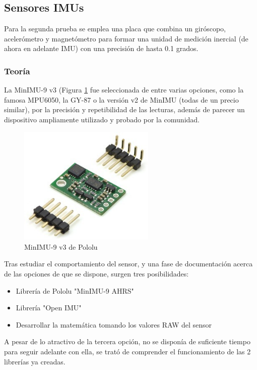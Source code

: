 
\subsection{Sensores IMUs}
Para la segunda prueba se emplea una placa que combina un giróscopo, acelerómetro y magnetómetro para formar una unidad de medición inercial (de ahora en adelante IMU) con una precisión de hasta 0.1 grados.

\subsubsection{Teoría}

La MinIMU-9 v3 (Figura \ref{fig:MinIMU_board} fue seleccionada de entre varias opciones, como la famosa MPU6050, la GY-87 o la versión v2 de MinIMU (todas de un precio similar), por la precisión y repetibilidad de las lecturas, además de parecer un dispositivo ampliamente utilizado y probado por la comunidad.

\begin{figure}
\centering
\includegraphics[width=65mm]{Figures/MinIMU_board}
\caption[MinIMU-9 v3 de Pololu]{MinIMU-9 v3 de Pololu}
\label{fig:MinIMU_board}
\end{figure}

Tras estudiar el comportamiento del sensor, y una fase de documentación acerca de las opciones de que se dispone, surgen tres posibilidades:

\begin{itemize}
  \item Librería de Pololu "MinIMU-9 AHRS"
  \item Librería "Open IMU"
  \item Desarrollar la matemática tomando los valores RAW del sensor
\end{itemize}

A pesar de lo atractivo de la tercera opción, no se disponía de suficiente tiempo para seguir adelante con ella, se trató de comprender el funcionamiento de las 2 librerías ya creadas.

